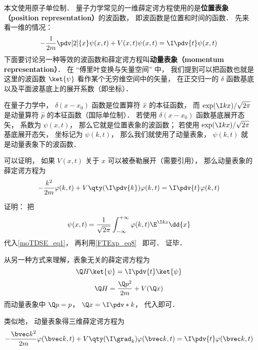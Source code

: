 
\begin{issues}
\issueDraft
\end{issues}


本文使用原子单位制． 量子力学常见的一维薛定谔方程使用的是\textbf{位置表象（position representation）}的波函数， 即波函数是位置和时间的函数． 先来看一维的情况：
\begin{equation}\label{moTDSE_eq1}
-\frac{1}{2m} \pdv[2]{x}\psi(x, t) + V(x,t)\psi(x,t) = \I \pdv{t} \psi(x,t)
\end{equation}
下面要讨论另一种等效的波函数和薛定谔方程叫\textbf{动量表象（momentum representation）}． 在 “傅里叶变换与矢量空间” 中， 我们提到可以把函数也就是这里的波函数 $\ket{\psi}$ 看作某个无穷维空间中的矢量， 在正交归一的 $\delta$ 函数基底以及平面波基底上的展开系数（即坐标）．

在量子力学中， $\delta(x-x_0)$ 函数是位置算符 $\hat x$ 的本征函数， 而 $\exp(\I kx)/\sqrt{2\pi}$ 是动量算符 $\hat p$ 的本征函数（国际单位制）． 若使用 $\delta(x-x_0)$ 函数基底展开态矢， 系数为 $\psi(x, t)$， 那么它就是位置表象的波函数； 若使用 $\exp(\I kx)/\sqrt{2\pi}$ 基底展开态矢， 坐标记为 $\psi(k, t)$， 那么我们就使用了动量表象， $\psi(k, t)$ 就是动量表象下的波函数．

 可以证明， 如果 $V(x,t)$ 关于 $x$ 可以被泰勒展开（需要引用）， 那么动量表象的薛定谔方程为
\begin{equation}
-\frac{k^2}{2m}\varphi(k, t) + V\qty(\I \pdv{k})\varphi(k, t) = \I \pdv{t} \varphi(k,t)
\end{equation}

证明： 把
\begin{equation}
\psi(x,t) = \frac{1}{\sqrt{2\pi}}\int_{-\infty}^{+\infty} \varphi(k,t)\E^{\I kx}\dd{x}
\end{equation}
代入\autoref{moTDSE_eq1}， 再利用\autoref{FTExp_eq8}~ 即可． 证毕．

从另一种方式来理解，表象无关的薛定谔方程为
\begin{equation}
\Q H\ket{\psi} = \I \pdv{t}\ket{\psi}
\end{equation}
\begin{equation}
\Q H = \frac{\Q p^2}{2m} + V(\Q x)
\end{equation}
而动量表象中 $\Q p = p$， $\Q x  = \I \pdv*{k}$， 代入即可．


类似地， 动量表象得三维薛定谔方程为
\begin{equation}
-\frac{\bvec k^2}{2m}\varphi(\bvec k, t) + V\qty(\I \grad_k)\varphi(\bvec k, t) = \I \pdv{t} \varphi(\bvec k,t)
\end{equation}
